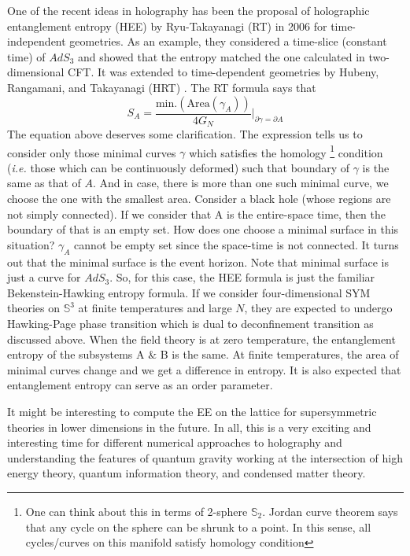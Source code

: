 One of the recent ideas in holography has been the proposal of holographic entanglement entropy (HEE) 
by Ryu-Takayanagi (RT) in 2006 for time-independent geometries. As an example, they considered a time-slice (constant time) 
of $AdS_{3}$ and showed that the entropy matched the one calculated in two-dimensional CFT. 
It was extended to time-dependent geometries by Hubeny, Rangamani, and Takayanagi (HRT) \cite{2007JHEP...07..062H}.
The RT formula says that \begin{equation}
S_{A} = \frac{\text{min.}(\text{Area}(\gamma_{A}))}{4G_{N}} \Bigg \vert_{\partial \gamma = \partial A} 
\end{equation} 
The equation above deserves some clarification. The expression tells us to consider only those minimal curves $\gamma$ which satisfies
the homology \footnote{One can think about this in terms of 2-sphere $\mathbb{S}_{2}$. 
Jordan curve theorem says that any cycle on the sphere can be shrunk to a point. In this 
sense, all cycles/curves on this manifold satisfy homology condition} condition (\emph{i.e.} 
those which can be continuously deformed) such that boundary of $\gamma$ is the same as 
that of $A$. And in case, there is more than one such minimal curve, we choose the one with 
the smallest area. 
Consider a black hole (whose regions are not simply connected). If we consider that A is the 
entire-space time, then the boundary of that is an empty set. How does one choose a minimal 
surface in this situation? $\gamma_{A}$ cannot be empty set since the space-time is not 
connected. It turns out that the minimal surface is the event horizon. Note that minimal surface is just a curve for $AdS_{3}$.
So, for this case, the HEE formula is just the familiar Bekenstein-Hawking entropy formula. 
If we consider four-dimensional SYM theories on $\mathbb{S}^{3}$ 
at finite temperatures and large $N$, they are expected to undergo Hawking-Page phase 
transition which is dual to deconfinement transition as discussed above. When the field 
theory is at zero temperature, the entanglement entropy of the subsystems A $\&$ B is 
the same. At finite temperatures, the area of minimal curves change and we get a difference 
in entropy. It is also expected that entanglement entropy can serve as an order parameter. 

It might be interesting to compute the EE on the lattice for supersymmetric theories
in lower dimensions in the future. 
In all, this is a very exciting and interesting time for different numerical approaches to holography 
and understanding the features of quantum gravity working at the intersection of high energy theory, 
quantum information theory, and condensed matter theory.
